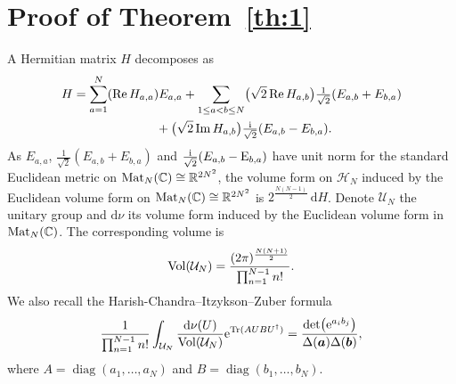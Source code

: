 \documentclass[10pt,a4paper]{amsart}
\numberwithin{equation}{section}
\newcommand{\dd}{\mathrm{d}}
\begin{document}
\section{Proof of Theorem~\ref{th:1}}
\label{S2}
A Hermitian matrix $H$ decomposes as
\begin{gather*}
H = \sum_{a = 1}^N (\operatorname{Re} H_{a,a}) E_{a,a}+ \sum_{1 \leq a < b \leq N} \bigl(\sqrt{2} \operatorname{Re} H_{a,b}\bigr) \tfrac{1}{\sqrt{2}}(E_{a,b} + E_{b,a}) \\
\hphantom{H =}{}
 + \bigl(\sqrt{2} \operatorname{Im} H_{a,b}\bigr) \tfrac{{\rm i}}{\sqrt{2}}(E_{a,b} - E_{b,a}).
\end{gather*}
As $E_{a,a}$, $\frac{1}{\sqrt{2}}(E_{a,b} + E_{b,a})$ and $\frac{{\rm i}}{\sqrt{2}}(E_{a,b} - {\rm E}_{b,a})$ have unit norm for the standard Euclidean metric on ${\rm Mat}_{N}(\mathbb{C}) \cong \mathbb{R}^{2N^2}$, the volume form on $\mathcal{H}_N$ induced by the Euclidean volume form on ${\rm Mat}_N(\mathbb{C}) \cong \mathbb{R}^{2N^2}$ is $2^{\frac{N(N - 1)}{2}}\,\dd H$. Denote $\mathcal{U}_N$ the unitary group and $\dd\nu$ its volume form induced by the Euclidean volume form in ${\rm Mat}_N(\mathbb{C})$. The corresponding volume is
 \[
 {\rm Vol}(\mathcal{U}_N) = \frac{(2\pi)^{\frac{N(N + 1)}{2}}}{\prod_{n = 1}^{N - 1} n!}.
\]
We also recall the Harish-Chandra--Itzykson--Zuber formula \cite{Itzykson:1979fi}
\[
\frac{1}{\prod_{n = 1}^{N - 1} n!} \int_{\mathcal{U}_N} \frac{\dd \nu(U)}{{\rm Vol}(\mathcal{U}_N)} {\rm e}^{{\rm Tr}(AUBU^{\dagger})} = \frac{\det\bigl({\rm e}^{a_ib_j}\bigr)}{\Delta(\boldsymbol{a})\Delta(\boldsymbol{b})},
\]
 where $A = \operatorname{diag}(a_1,\dots,a_N)$ and $B = \operatorname{diag}(b_1,\dots,b_N)$.
\end{document}
